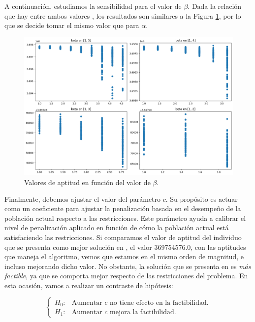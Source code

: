 \documentclass[12pt,a4paper]{book}
\begin{document}
A continuación, estudiamos la sensibilidad para el valor de $\beta$. Dada la relación que hay entre ambos valores \cite{yu_introduction_2010}, los resultados son similares a la Figura \ref{fig:beta_analisis}, por lo que se decide tomar el mismo valor que para $\alpha$. 

\begin{figure}[h] 
    	\begin{center}
    	\includegraphics[width=\textwidth]{img/beta_anl.png}
    	\end{center}
    	\caption{Valores de aptitud en función del valor de $\beta$.}
    	\label{fig:beta_analisis}
	\end{figure}

Finalmente, debemos ajustar el valor del parámetro $c$.  Su propósito es actuar como un coeficiente para ajustar la penalización basada en el desempeño de la población actual respecto a las restricciones. Este parámetro ayuda a calibrar el nivel de penalización aplicado en función de cómo la población actual está satisfaciendo las restricciones. Si comparamos el valor de aptitud del individuo que se presenta como mejor solución en \cite{park_vertiport_2022}, el valor 369754576.0, con las aptitudes que maneja el algoritmo, vemos que estamos en el mismo orden de magnitud, e incluso mejorando dicho valor. No obstante, la solución que se presenta en \cite{park_vertiport_2022} es \textsl{más factible}, ya que se comporta mejor respecto de las restricciones del problema. En esta ocasión, vamos a realizar un contraste de hipótesis: 


\begin{equation}
	\left \lbrace \begin{matrix}
		H_0: &\text{Aumentar $c$ no tiene efecto en la factibilidad.} \\
		
		H_1: & \text{Aumentar $c$ mejora la factibilidad.} 
	\end{matrix} \right.
\end{equation}
\end{document}
